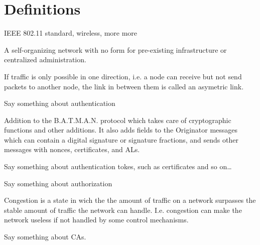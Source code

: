 \chapter*{Definitions}


\begin{acronym}

	IEEE 802.11 standard, wireless, more more

	A self-organizing network with no form for pre-existing infrastructure or
	centralized administration.

	If traffic is only possible in one direction, i.e. a node can receive but not
	send packets to another node, the link in between them is called an asymetric
	link.


	Say something about authentication

	Addition to the B.A.T.M.A.N. protocol which takes care of cryptographic
	functions and other additions. It also adds fields to the Originator messages
	which can contain a digital signature or signature fractions, and sends other
	messages with nonces, certificates, and ALs.

	Say something about authentication tokes, such as certificates and so on\ldots

	Say something about authorization

	Congestion is a state in wich the the amount of traffic on a network surpasses
	the stable amount of traffic the network can handle. I.e. congestion can make
	the network useless if not handled by some control mechanisms.
	
	Say something about CAs.



\end{acronym}
